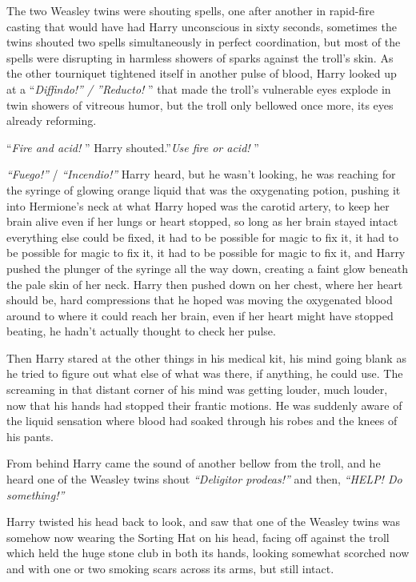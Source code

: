 The two Weasley twins were shouting spells, one after another in
rapid-fire casting that would have had Harry unconscious in sixty
seconds, sometimes the twins shouted two spells simultaneously in
perfect coordination, but most of the spells were disrupting in harmless
showers of sparks against the troll's skin. As the other tourniquet
tightened itself in another pulse of blood, Harry looked up at a
``\emph{Diffindo!'' / ''Reducto!} '' that made the troll's vulnerable eyes
explode in twin showers of vitreous humor, but the troll only bellowed
once more, its eyes already reforming.

``\emph{Fire and acid!} '' Harry shouted.''\emph{Use fire or acid!} ''

\emph{``Fuego!''} / \emph{``Incendio!''} Harry heard, but he wasn't
looking, he was reaching for the syringe of glowing orange liquid that
was the oxygenating potion, pushing it into Hermione's neck at what
Harry hoped was the carotid artery, to keep her brain alive even if her
lungs or heart stopped, so long as her brain stayed intact everything
else could be fixed, it had to be possible for magic to fix it, it had
to be possible for magic to fix it, it had to be possible for magic to
fix it, and Harry pushed the plunger of the syringe all the way down,
creating a faint glow beneath the pale skin of her neck. Harry then
pushed down on her chest, where her heart should be, hard compressions
that he hoped was moving the oxygenated blood around to where it could
reach her brain, even if her heart might have stopped beating, he hadn't
actually thought to check her pulse.

Then Harry stared at the other things in his medical kit, his mind going
blank as he tried to figure out what else of what was there, if
anything, he could use. The screaming in that distant corner of his mind
was getting louder, much louder, now that his hands had stopped their
frantic motions. He was suddenly aware of the liquid sensation where
blood had soaked through his robes and the knees of his pants.

From behind Harry came the sound of another bellow from the troll, and
he heard one of the Weasley twins shout \emph{``Deligitor prodeas!''}
and then, \emph{``HELP! Do something!''}

Harry twisted his head back to look, and saw that one of the Weasley
twins was somehow now wearing the Sorting Hat on his head, facing off
against the troll which held the huge stone club in both its hands,
looking somewhat scorched now and with one or two smoking scars across
its arms, but still intact.

